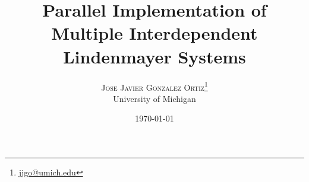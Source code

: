 \documentclass[letterpaper,twoside,11pt]{article}
\title{\vspace{-15mm}\fontsize{24pt}{10pt}\selectfont\textbf{Parallel Implementation of Multiple Interdependent Lindenmayer Systems}} %
\author{
\large
\textsc{Jose Javier Gonzalez Ortiz}\thanks{\href{mailto:jjgo@umich.edu}{jjgo@umich.edu}}\\[2mm] %
\normalsize University of Michigan \\ %
}
\date{\today}
\begin{document}
\maketitle %

\thispagestyle{fancy} %


\begin{abstract}

\noindent \lipsum[1] %

\end{abstract}

\end{document}
